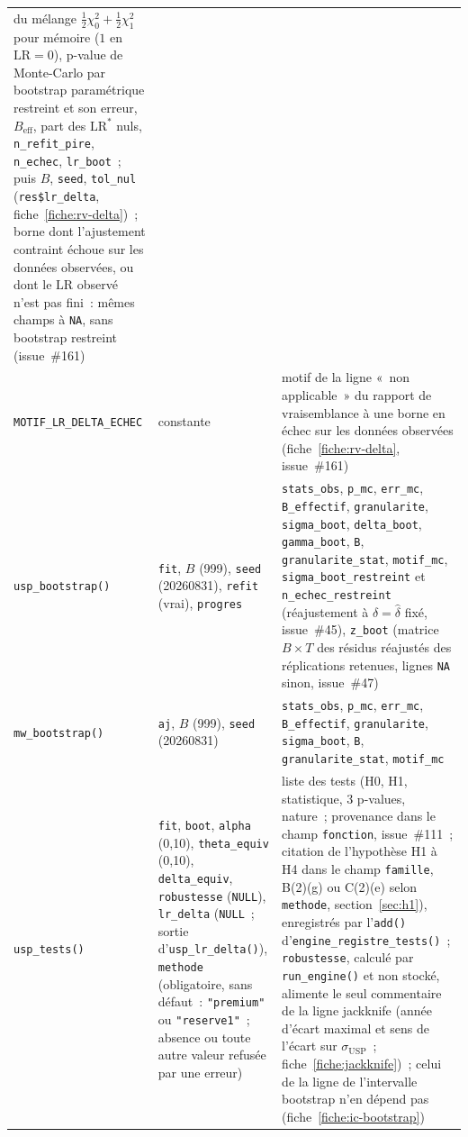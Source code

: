 \documentclass[a4paper,11pt]{article}
\newcommand{\code}[1]{\texttt{\small #1}}
\begin{document}
{\begin{longtable}{@{}p{4.6cm}p{4.0cm}p{6.2cm}@{}}
du mélange $\tfrac12\chi^2_0 + \tfrac12\chi^2_1$ pour mémoire ($1$ en $\mathrm{LR} = 0$), p-value de
Monte-Carlo par bootstrap paramétrique restreint et son erreur, $B_{\text{eff}}$, part des
$\mathrm{LR}^{*}$ nuls, \code{n\_refit\_pire}, \code{n\_echec}, \code{lr\_boot}~; puis $B$,
\code{seed}, \code{tol\_nul} (\code{res\$lr\_delta}, fiche~\ref{fiche:rv-delta})~; borne dont
l'ajustement contraint échoue sur les données observées, ou dont le $\mathrm{LR}$ observé n'est
pas fini~: mêmes champs à \code{NA}, sans bootstrap restreint (issue~\#161) \\
\code{MOTIF\_LR\_DELTA\_ECHEC} & constante & motif de la ligne «~non applicable~» du rapport de
vraisemblance à une borne en échec sur les données observées (fiche~\ref{fiche:rv-delta},
issue~\#161) \\
\code{usp\_bootstrap()} & \code{fit}, $B$ (999), \code{seed} (20260831),
\code{refit} (vrai), \code{progres} &
\code{stats\_obs}, \code{p\_mc}, \code{err\_mc}, \code{B\_effectif},
\code{granularite}, \code{sigma\_boot}, \code{delta\_boot}, \code{gamma\_boot}, \code{B},
\code{granularite\_stat}, \code{motif\_mc}, \code{sigma\_boot\_restreint} et
\code{n\_echec\_restreint} (réajustement à $\delta = \hat\delta$ fixé, issue~\#45), \code{z\_boot}
(matrice $B \times T$ des résidus réajustés des réplications retenues, lignes \code{NA} sinon,
issue~\#47) \\
\code{mw\_bootstrap()} & \code{aj}, $B$ (999), \code{seed} (20260831) &
\code{stats\_obs}, \code{p\_mc}, \code{err\_mc},
\code{B\_effectif}, \code{granularite}, \code{sigma\_boot}, \code{B}, \code{granularite\_stat},
\code{motif\_mc} \\
\code{usp\_tests()} & \code{fit}, \code{boot}, \code{alpha} (0,10),
\code{theta\_equiv} (0,10), \code{delta\_equiv}, \code{robustesse} (\code{NULL}),
\code{lr\_delta} (\code{NULL}~; sortie d'\code{usp\_lr\_delta()}),
\code{methode} (obligatoire, sans défaut~: \code{"premium"} ou \code{"reserve1"}~; absence ou
toute autre valeur refusée par une erreur) &
liste des tests (H0, H1, statistique, 3 p-values, nature~; provenance dans le champ
\code{fonction}, issue~\#111~; citation de l'hypothèse H1 à H4 dans le champ \code{famille}, B(2)(g) ou C(2)(e) selon \code{methode}, section~\ref{sec:h1}), enregistrés par l'\code{add()}
d'\code{engine\_registre\_tests()}~; \code{robustesse}, calculé par
\code{run\_engine()} et non stocké, alimente le seul commentaire de la ligne jackknife (année
d'écart maximal et sens de l'écart sur $\sigma_{\mathrm{USP}}$~; fiche~\ref{fiche:jackknife})~;
celui de la ligne de l'intervalle bootstrap n'en dépend pas (fiche~\ref{fiche:ic-bootstrap}) \\

\end{longtable}}
\end{document}
